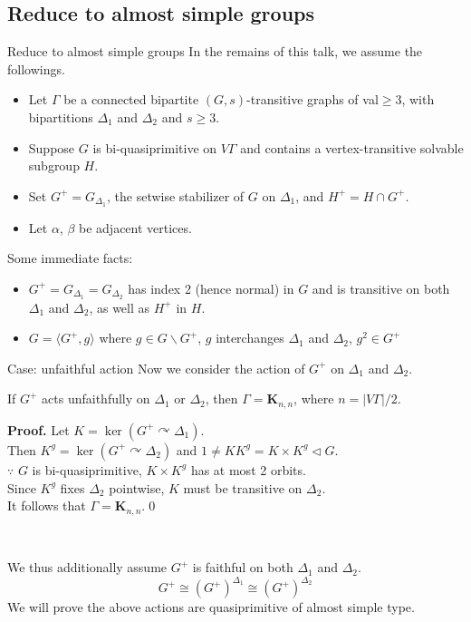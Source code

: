 \documentclass{beamer}
\def\proof#1{\textbf{Proof.}{#1}\qed}
\begin{document}
\subsection{Reduce to almost simple groups} 
\begin{frame}{Reduce to almost simple groups}
In the remains of this talk, we assume the followings.

\begin{itemize}
	\item Let $\Gamma$ be a connected bipartite $(G,s)$-transitive graphs of val$\geq 3$, with bipartitions $\Delta_1$ and $\Delta_2$ and $s\geq 3$.
	\item Suppose $G$ is bi-quasiprimitive on $V\Gamma$ and contains a vertex-transitive solvable subgroup $H$. 
	\item Set $G^+=G_{\Delta_1}$, the setwise stabilizer of $G$ on $\Delta_1$, and $H^+=H\cap G^+$.
	\item Let $\alpha$, $\beta$ be adjacent vertices.
\end{itemize}

Some immediate facts:
\begin{itemize}
	\item $G^+=G_{\Delta_1}=G_{\Delta_2}$ has index 2 (hence normal) in $G$ and is transitive on both $\Delta_1$ and $\Delta_2$, as well as $H^+$ in $H$.
	\item $G=\langle G^+,g\rangle$ where $g\in G\backslash G^+$, $g$ interchanges $\Delta_1$ and $\Delta_2$, $g^2\in G^+$
\end{itemize}

\end{frame}


\begin{frame}{Case: unfaithful action}
Now we consider the action of $G^+$ on $\Delta_1$ and $\Delta_2$.
\begin{lemma}[4.2]
	If $G^+$ acts unfaithfully on $\Delta_1$ or $\Delta_2$, then $\Gamma=\mathbf{K}_{n,n}$, where $n=|V\Gamma |/2$.
\end{lemma}
\proof{
Let $K=\ker(G^+\curvearrowright\Delta_1)$. \\Then $K^g=\ker(G^+\curvearrowright\Delta_2)$ and $1\neq KK^g=K\times K^g\triangleleft G$.\\$\because$ $G$ is bi-quasiprimitive, $K\times K^g$ has at most 2 orbits.\\Since $K^g$ fixes $\Delta_2$ pointwise, $K$ must be transitive on $\Delta_2$.\\It follows that $\Gamma=\mathbf{K}_{n,n}$.}

\ 

We thus additionally assume $G^+$ is faithful on both $\Delta_1$ and $\Delta_2$.\[G^+\cong (G^+)^{\Delta_1}\cong (G^+)^{\Delta_2}\]
We will prove the above actions are quasiprimitive of almost simple type.
\end{frame}
\end{document}
